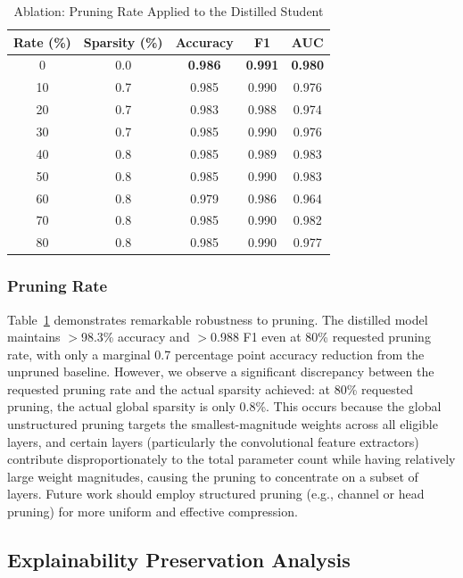 \documentclass[lettersize,journal]{IEEEtran}
\begin{document}
\begin{table}[!t]
\caption{Ablation: Pruning Rate Applied to the Distilled Student\label{tab:ablation_pruning}}
\centering
\footnotesize
\begin{tabular}{ccccc}
\toprule
\textbf{Rate (\%)} & \textbf{Sparsity (\%)} & \textbf{Accuracy} & \textbf{F1} & \textbf{AUC} \\
\midrule
0 & 0.0 & \textbf{0.986} & \textbf{0.991} & \textbf{0.980} \\
10 & 0.7 & 0.985 & 0.990 & 0.976 \\
20 & 0.7 & 0.983 & 0.988 & 0.974 \\
30 & 0.7 & 0.985 & 0.990 & 0.976 \\
40 & 0.8 & 0.985 & 0.989 & 0.983 \\
50 & 0.8 & 0.985 & 0.990 & 0.983 \\
60 & 0.8 & 0.979 & 0.986 & 0.964 \\
70 & 0.8 & 0.985 & 0.990 & 0.982 \\
80 & 0.8 & 0.985 & 0.990 & 0.977 \\
\bottomrule
\end{tabular}
\end{table}

\subsubsection{Pruning Rate}
Table~\ref{tab:ablation_pruning} demonstrates remarkable robustness to pruning. The distilled model maintains $>$98.3\% accuracy and $>$0.988 F1 even at 80\% requested pruning rate, with only a marginal 0.7 percentage point accuracy reduction from the unpruned baseline. However, we observe a significant discrepancy between the requested pruning rate and the actual sparsity achieved: at 80\% requested pruning, the actual global sparsity is only 0.8\%. This occurs because the global unstructured pruning targets the smallest-magnitude weights across all eligible layers, and certain layers (particularly the convolutional feature extractors) contribute disproportionately to the total parameter count while having relatively large weight magnitudes, causing the pruning to concentrate on a subset of layers. Future work should employ structured pruning (e.g., channel or head pruning) for more uniform and effective compression.


\subsection{Explainability Preservation Analysis}
\end{document}
